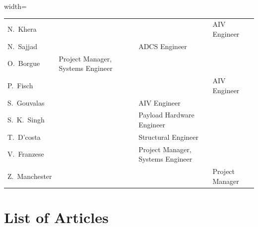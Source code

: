 \documentclass[a4paper,nobib,justified,final]{tufte-book}
\begin{document}
\begin{fullwidth}
\begin{table}[h]
\begin{adjustbox}{width=\textwidth}
\begin{tabular}{@{}lllll@{}}
	N.~Khera &  &  & & \textcolor{AIV}{AIV Engineer}  \\
	N.~Sajjad &  &  & \textcolor{ADCS}{ADCS Engineer} &  \\
	O.~Borgue & \textcolor{Manager}{Project Manager}, \textcolor{Systems}{Systems Engineer} &  &  &  \\
	P.~Fisch &  &  &  & \textcolor{AIV}{AIV Engineer} \\
	S.~Gouvalas &  &  & \textcolor{AIV}{AIV Engineer} &  \\
	S.~K.~Singh &  &  & \textcolor{Hardware}{Payload Hardware Engineer} &  \\
	T.~D'costa &  &  & \textcolor{Structural}{Structural Engineer} &  \\
	V.~Franzese &  &  & \textcolor{Manager}{Project Manager}, \textcolor{Systems}{Systems Engineer} &  \\
	Z.~Manchester &  &  & & \textcolor{Manager}{Project Manager}  \\ \bottomrule
\end{tabular}
	\end{adjustbox}
	\vspace{1ex}
\end{table}


\chapter{List of Articles}
\nocite{contrib1,contrib2,contrib3,contrib4,contrib5,contrib6,contrib7,contrib8,contrib10,contrib11,contrib12,contrib13}
\renewcommand*{\mkbibnamegiven}[1]{\ifitemannotation{highlight}{\textbf{#1}}{#1}}
\renewcommand*{\mkbibnamefamily}[1]{\ifitemannotation{highlight}{\textbf{#1}}{#1}}
\printbibliography[category=contributions,type=article,heading=subbibliography,title={Journal Publications},resetnumbers=true]
\printbibliography[category=contributions,type=inproceedings,heading=subbibliography,title={Conference Papers},resetnumbers=false]
\printbibliography[category=contributions,type=unpublished,heading=subbibliography,title={Conference Presentations},resetnumbers=false]


\printbibliography[heading=bibnumbered,notcategory=contributions,resetnumbers=true]
\end{fullwidth}
\end{document}
